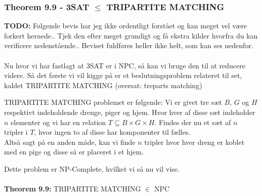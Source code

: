 \subsubsection{Theorem 9.9 - 3SAT $\leq$ TRIPARTITE MATCHING }

\textbf{TODO: } Følgende bevis har jeg ikke ordentligt forstået og kan meget
vel være forkert hernede.. Tjek den efter meget grundigt og få ekstra kilder
hvorfra du kan verificere nedenstående.. Beviset fuldføres heller ikke helt,
som kan ses nedenfor. \\
~\\
Nu hvor vi har fastlagt at 3SAT er i NPC, så kan vi bruge den til at reducere
videre. Så det første vi vil kigge på er et beslutningsproblem relateret til
set, kaldet TRIPARTITE MATCHING (oversat: treparts matching)

TRIPARTITE MATCHING problemet er følgende: Vi er givet tre sæt $B$, $G$ og $H$
respektivt indeholdende drenge, piger og hjem. Hvor hver af disse sæt
indeholder $n$ elementer og vi har en relation $T \subseteq B \times G \times
H$. Findes der nu et sæt af $n$ tripler i $T$, hvor ingen to af disse har
komponenter til fælles. \\

Altså sagt på en anden måde, kan vi finde $n$ tripler hvor hver dreng er koblet
med en pige og disse så er placeret i et hjem.

Dette problem er NP-Complete, hvilket vi så nu vil vise.
\\
~\\
\textbf{Theorem 9.9:} TRIPARTITE MATCHING $\in$ NPC

